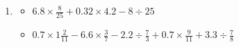 \documentclass[11pt,a4paper]{article}
\begin{document}
\begin{enumerate}
\item[二、计算] 
\begin{itemize}
    \item[1.] $6.8 \times \frac{8}{25} + 0.32 \times 4.2 - 8 \div 25$
    \vspace{3cm}
    \item[2.] $0.7 \times 1\frac{2}{11} - 6.6 \times \frac{3}{7} - 2.2 \div \frac{7}{3} + 0.7 \times \frac{9}{11} + 3.3 \div \frac{7}{8}$
    \vspace{3cm}
\end{itemize}

\end{enumerate}
\end{document}
